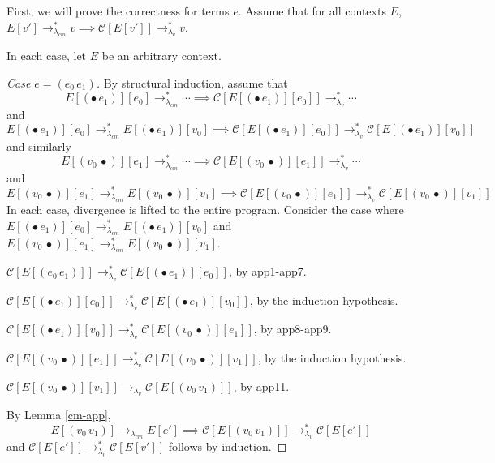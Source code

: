 \documentclass[ms,electronic,twosidetoc,letterpaper,chaptercenter,parttop]{byumsphd}
\newcommand{\lvrr}{\rightarrow_{\lambda_v}}
\newcommand{\lvrrs}{\rightarrow_{\lambda_v}^{*}}
\newcommand{\cmrr}{\rightarrow_{\lambda_{cm}}}
\newcommand{\cmrrs}{\rightarrow_{\lambda_{cm}}^{*}}
\newcommand{\C}[1]{\mathcal{C}[#1]}
\newcommand{\app}[2]{(#1\,#2)}
\newcommand{\hole}{\bullet}
\begin{document}
First, we will prove the correctness for terms $e$. Assume that for all contexts $E$, $E[v']\cmrrs v\implies\C{E[v']}\lvrrs v$.

In each case, let $E$ be an arbitrary context.

\begin{proof}[Case $e=\app{e_0}{e_1}$]
By structural induction, assume that 
\[
E[\app{\hole}{e_1}][e_0]\cmrrs\cdots\implies\C{E[\app{\hole}{e_1}][e_0]}\lvrrs\cdots
\]
and
\[
E[\app{\hole}{e_1}][e_0]\cmrrs E[\app{\hole}{e_1}][v_0]\implies\C{E[\app{\hole}{e_1}][e_0]}\lvrrs\C{E[\app{\hole}{e_1}][v_0]}
\]
and similarly
\[
E[\app{v_0}{\hole}][e_1]\cmrrs\cdots\implies\C{E[\app{v_0}{\hole}][e_1]}\lvrrs\cdots
\]
and
\[
E[\app{v_0}{\hole}][e_1]\cmrrs E[\app{v_0}{\hole}][v_1]\implies\C{E[\app{v_0}{\hole}][e_1]}\lvrrs\C{E[\app{v_0}{\hole}][v_1]}
\]
In each case, divergence is lifted to the entire program. Consider the case where $E[\app{\hole}{e_1}][e_0]\cmrrs E[\app{\hole}{e_1}][v_0]$ and $E[\app{v_0}{\hole}][e_1]\cmrrs E[\app{v_0}{\hole}][v_1]$.

$\C{E[\app{e_0}{e_1}]}\lvrrs\C{E[\app{\hole}{e_1}][e_0]}$, by app1-app7.

$\C{E[\app{\hole}{e_1}][e_0]}\lvrrs\C{E[\app{\hole}{e_1}][v_0]}$, by the induction hypothesis.

$\C{E[\app{\hole}{e_1}][v_0]}\lvrrs\C{E[\app{v_0}{\hole}][e_1]}$, by app8-app9.

$\C{E[\app{v_0}{\hole}][e_1]}\lvrrs\C{E[\app{v_0}{\hole}][v_1]}$, by the induction hypothesis.

$\C{E[\app{v_0}{\hole}][v_1]}\lvrr\C{E[\app{v_0}{v_1}]}$, by app11.

By Lemma \ref{cm-app},
\[
E[\app{v_0}{v_1}]\cmrr E[e']\implies\C{E[\app{v_0}{v_1}]}\lvrrs\C{E[e']}
\]
and $\C{E[e']}\lvrrs\C{E[v']}$ follows by induction.
\end{proof}
\end{document}

